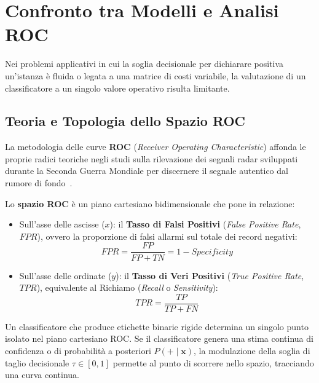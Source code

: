 \FloatBarrier
\section{Confronto tra Modelli e Analisi ROC}
\label{sec:dm-roc-analysis}

Nei problemi applicativi in cui la soglia decisionale per dichiarare positiva un'istanza è fluida o legata a una matrice di costi variabile, la valutazione di un classificatore a un singolo valore operativo risulta limitante.

\FloatBarrier
\subsection{Teoria e Topologia dello Spazio ROC}
\label{subsec:dm-roc-space-theory}

La metodologia delle curve \textbf{ROC} (\textit{Receiver Operating Characteristic}) affonda le proprie radici teoriche negli studi sulla rilevazione dei segnali radar sviluppati durante la Seconda Guerra Mondiale per discernere il segnale autentico dal rumore di fondo~\cite{fawcett2006}.

Lo \textbf{spazio ROC} è un piano cartesiano bidimensionale che pone in relazione:
\begin{itemize}
    \item Sull'asse delle ascisse ($x$): il \textbf{Tasso di Falsi Positivi} (\textit{False Positive Rate}, $FPR$), ovvero la proporzione di falsi allarmi sul totale dei record negativi:
    \begin{equation}
        FPR = \frac{FP}{FP + TN} = 1 - Specificity
    \end{equation}
    \item Sull'asse delle ordinate ($y$): il \textbf{Tasso di Veri Positivi} (\textit{True Positive Rate}, $TPR$), equivalente al Richiamo (\textit{Recall} o \textit{Sensitivity}):
    \begin{equation}
        TPR = \frac{TP}{TP + FN}
    \end{equation}
\end{itemize}

Un classificatore che produce etichette binarie rigide determina un singolo punto isolato nel piano cartesiano ROC. Se il classificatore genera una stima continua di confidenza o di probabilità a posteriori $P(+ \mid \mathbf{x})$, la modulazione della soglia di taglio decisionale $\tau \in [0, 1]$ permette al punto di scorrere nello spazio, tracciando una curva continua.

